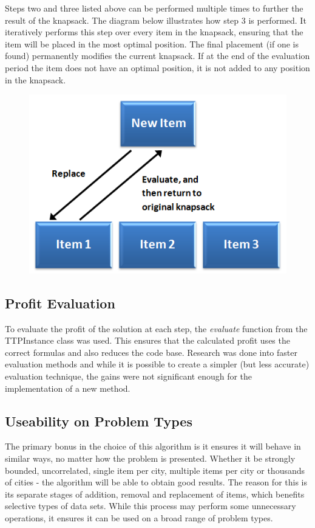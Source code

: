 \documentclass[a4paper,12pt]{article}
\begin{document}
\newpage

Steps two and three listed above can be performed multiple times to further the result of the knapsack. The diagram below illustrates how step 3 is performed. It iteratively performs this step over every item in the knapsack, ensuring that the item will be placed in the most optimal position. The final placement (if one is found) permanently modifies the current knapsack. If at the end of the evaluation period the item does not have an optimal position, it is not added to any position in the knapsack.
\begin{figure}[h]
\centering
\includegraphics{ObsessivePacking.png}
\end{figure}

\subsection{Profit Evaluation}
To evaluate the profit of the solution at each step, the \textit{evaluate} function from the TTPInstance class was used. This ensures that the calculated profit uses the correct formulas and also reduces the code base. Research was done into faster evaluation methods and while it is possible to create a simpler (but less accurate) evaluation technique, the gains were not significant enough for the implementation of a new method.

\subsection{Useability on Problem Types}
The primary bonus in the choice of this algorithm is it ensures it will behave in similar ways, no matter how the problem is presented. Whether it be strongly bounded, uncorrelated, single item per city, multiple items per city or thousands of cities - the algorithm will be able to obtain good results. The reason for this is its separate stages of addition, removal and replacement of items, which benefits selective types of data sets. While this process may perform some unnecessary operations, it ensures it can be used on a broad range of problem types.
\end{document}
